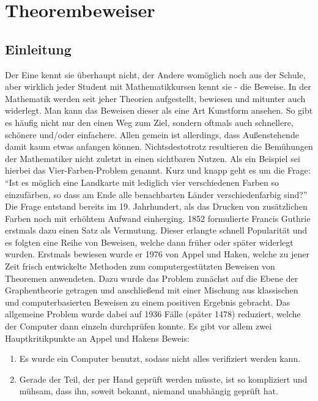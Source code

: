 
\chapter{Theorembeweiser}
\section{Einleitung}
Der Eine kennt sie überhaupt nicht, der Andere womöglich noch aus der Schule, aber wirklich
jeder Student mit Mathematikkursen kennt sie - die Beweise.
In der Mathematik werden seit jeher Theorien aufgestellt, bewiesen und mitunter auch widerlegt.
Man kann das Beweisen dieser als eine Art Kunstform ansehen.
So gibt es häufig nicht nur den einen Weg zum Ziel, sondern oftmals auch schnellere, schönere und/oder einfachere.
Allen gemein ist allerdings, dass Außenstehende damit kaum etwas anfangen können. Nichtsdestotrotz resultieren die Bemühungen der Mathematiker nicht zuletzt in einen sichtbaren Nutzen.
Als ein Beispiel sei hierbei das Vier-Farben-Problem genannt. Kurz und knapp geht es um die Frage: \enquote{Ist es möglich eine Landkarte mit lediglich vier verschiedenen Farben so einzufärben, so dass am Ende alle benachbarten Länder verschiedenfarbig sind?}
Die Frage entstand bereits im 19. Jahrhundert, als das Drucken von zusätzlichen Farben noch mit erhöhtem Aufwand einherging. 1852 formulierte Francis Guthrie erstmals dazu einen Satz als Vermutung. Dieser erlangte schnell Popularität und es folgten eine Reihe von Beweisen, welche dann früher oder später widerlegt wurden. Erstmals bewiesen wurde er 1976 von Appel und Haken, welche zu jener Zeit frisch entwickelte Methoden zum computergestützten Beweisen von Theoremen anwendeten. Dazu wurde das Problem zunächst auf die Ebene der Graphentheorie getragen und anschließend mit einer Mischung aus klassischen und computerbasierten Beweisen zu einem positiven Ergebnis gebracht. Das allgemeine Problem wurde dabei auf 1936 Fälle (später 1478) reduziert, welche der Computer dann einzeln durchprüfen konnte. Es gibt vor allem zwei Hauptkritikpunkte an Appel und Hakens Beweis:
\begin{enumerate}
\item Es wurde ein Computer benutzt, sodass nicht alles verifiziert werden kann.
\item  Gerade der Teil, der per Hand geprüft werden müsste, ist so kompliziert und
mühsam, dass ihn, soweit bekannt, niemand unabhängig geprüft hat.
\end{enumerate}

